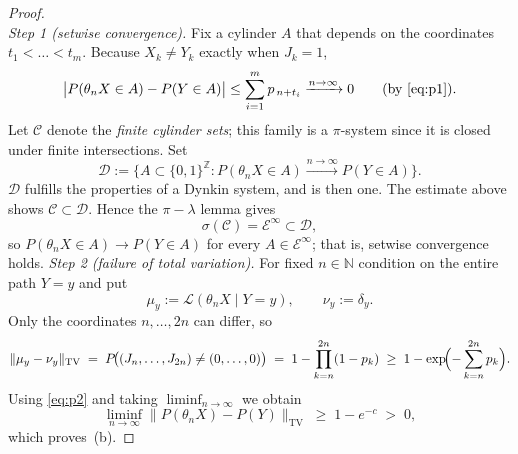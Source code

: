 \documentclass[11pt]{article}
\begin{document}
\begin{proof} \\
\textit{Step 1 (setwise convergence).}
Fix a cylinder \(A\) that depends on the coordinates \(t_{1}<\dots<t_{m}\).
Because \(X_{k}\neq Y_{k}\) exactly when \(J_{k}=1\),
\[
  \bigl|P(\theta_{n}X\in A)-P(Y\in A)\bigr|
     \le\sum_{i=1}^{m}p_{\,n+t_{i}}
     \xrightarrow{n\to\infty}0\qquad(\text{by }\eqref{eq:p1}).
\]
Let \(\mathcal C\) denote the \emph{finite cylinder sets}; this family is a
$\pi$-system since it is closed under finite intersections.
Set
\[
  \mathcal D:=\bigl\{A\subset\{0,1\}^{\mathbb Z} :
	P(\theta_{n}X\in A) \xrightarrow{n\to\infty}P(Y\in A)\bigr\}.
\]
\(\mathcal D\) fulfills the properties of a Dynkin system, and is then one.
The estimate above shows \(\mathcal C\subset\mathcal D\).
Hence the $\pi - \lambda$ lemma gives
\[
  \sigma(\mathcal C)=\mathcal E^{\infty}\subset\mathcal D,
\]
so \(P(\theta_{n}X\in A)\to P(Y\in A)\) for every
\(A\in\mathcal E^{\infty}\); that is, setwise convergence holds. 
\newline
\textit{Step 2 (failure of total variation).}
For fixed \(n\in\mathbb N\) condition on the entire path \(Y=y\) and put  
\[
  \mu_y:=\mathcal L(\theta_n X\mid Y=y),\qquad
  \nu_y:=\delta_y .
\]
Only the coordinates \(n,\dots,2n\) can differ, so
\[
  \|\mu_y-\nu_y\|_{\mathrm{TV}}
      \;=\;
      P\!\bigl((J_n,\dots,J_{2n})\neq(0,\dots,0)\bigr)
      \;=\;
      1-\prod_{k=n}^{2n}(1-p_k)
      \;\ge\;
      1-\exp\!\Bigl(-\sum_{k=n}^{2n}p_k\Bigr).
\]
Using \eqref{eq:p2} and taking \(\liminf_{n\to\infty}\) we obtain
\[
  \liminf_{n\to\infty}
  \bigl\|P(\theta_n X)-P(Y)\bigr\|_{\mathrm{TV}}
     \;\ge\;1-e^{-c}\;>\;0,
\]
which proves~(b).
\end{proof}
\end{document}
